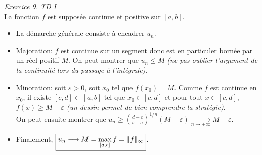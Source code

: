 \emph{Exercice 9. TD I}\\
La fonction $f$ est supposée continue et positive sur $[a, b]$.

\begin{itemize}
    \item La démarche générale consiste à encadrer $u_n$. 
    \item \underline{Majoration:} $f$ est continue sur un segment donc est en particuler bornée par un réel positif $M$. On peut montrer que $u_n \leqslant M$ \emph{(ne pas oublier l'argument de la continuité lors du passage à l'intégrale)}.
    \item \underline{Minoration:} soit $\varepsilon > 0$, soit $x_0$ tel que $f(x_0) = M$. Comme $f$ est continue en $x_0$, il existe $[c, d] \subset [a, b]$ tel que $x_0 \in [c, d]$ et pour tout $x \in [c, d]$, $f(x) \geqslant M - \varepsilon$ \emph{(un dessin permet de bien comprendre la stratégie)}.\\
    On peut ensuite montrer que $u_n \geqslant \left(\frac{d-c}{b-a} \right)^{1/n}(M-\varepsilon) \xrightarrow[n \to + \infty]{} M-\varepsilon$.
    \item Finalement, $\boxed{u_n \displaystyle \longrightarrow M = \max_{[ a, b ]} f = \Vert f \Vert_\infty}$.
\end{itemize}